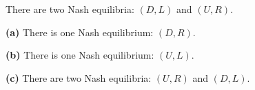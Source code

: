 \documentclass[12pt]{article}
\newenvironment{problem}[2][Problem]{\begin{trivlist}
\item[\hskip \labelsep {\bfseries #1}\hskip \labelsep {\bfseries #2.}]}{\end{trivlist}}
\newenvironment{subproblem}[1]{\textbf{(#1)}}{}
\theoremstyle{definition}
\begin{document}
\begin{problem}{2}
There are two Nash equilibria: $ (D, L) $ and $ (U, R) $.
\end{problem}

\begin{problem}{3}
\begin{subproblem}{a}
There is one Nash equilibrium: $ (D, R) $.
\end{subproblem}

\begin{subproblem}{b}
There is one Nash equilibrium: $ (U, L) $.
\end{subproblem}


\begin{subproblem}{c}
There are two Nash equilibria: $ (U, R) $ and $ (D, L) $.
\end{subproblem}
\end{problem}
\end{document}
